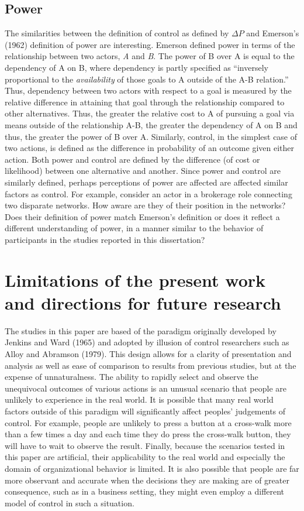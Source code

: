 \documentclass[USenglish,letterpaper,12pt,extrafontsizes,oneside,onecolumn,final]{memoir}
\newcommand{\deltap}{$\Delta P$}
\begin{document}
\subsection{Power}
The similarities between the definition of control as defined by \deltap \xspace and Emerson's (1962) definition of power are interesting.  Emerson defined power in terms of the relationship between two actors, \emph{A} and \emph{B}.  The power of B over A is equal to the dependency of A on B, where dependency is partly specified as ``inversely proportional to the \emph{availability} of those goals to A outside of the A-B relation.''  Thus, dependency between two actors with respect to a goal is measured by the relative difference in attaining that goal through the relationship compared to other alternatives. Thus, the greater the relative cost to A of pursuing a goal via means outside of the relationship A-B, the greater the dependency of A on B and thus, the greater the power of B over A.  Similarly, control, in the simplest case of two actions, is defined as the difference in probability of an outcome given either action.  Both power and control are defined by the difference (of cost or likelihood) between one alternative and another.  Since power and control are similarly defined, perhaps perceptions of power are affected are affected similar factors as control.  For example, consider an actor in a brokerage role connecting two disparate networks.  How aware are they of their position in the networks?  Does their definition of power match Emerson's definition or does it reflect a different understanding of power, in a manner similar to the behavior of participants in the studies reported in this dissertation?

\section{Limitations of the present work and directions for future research}
The studies in this paper are based of the paradigm originally developed by Jenkins and Ward (1965) and adopted by illusion of control researchers such as Alloy and Abramson (1979).  This design allows for a clarity of presentation and analysis as well as ease of comparison to results from previous studies, but at the expense of unnaturalness.  The ability to rapidly select and observe the unequivocal outcomes of various actions is an unusual scenario that people are unlikely to experience in the real world.  It is possible that many real world factors outside of this paradigm will significantly affect peoples' judgements of control. For example, people are unlikely to press a button at a cross-walk more than a few times a day and each time they do press the cross-walk button, they will have to wait to observe the result. Finally, because the scenarios tested in this paper are artificial, their applicability to the real world and especially the domain of organizational behavior is limited. It is also possible that people are far more observant and accurate when the decisions they are making are of greater consequence, such as in a business setting, they might even employ a different model of control in such a situation.
\end{document}
